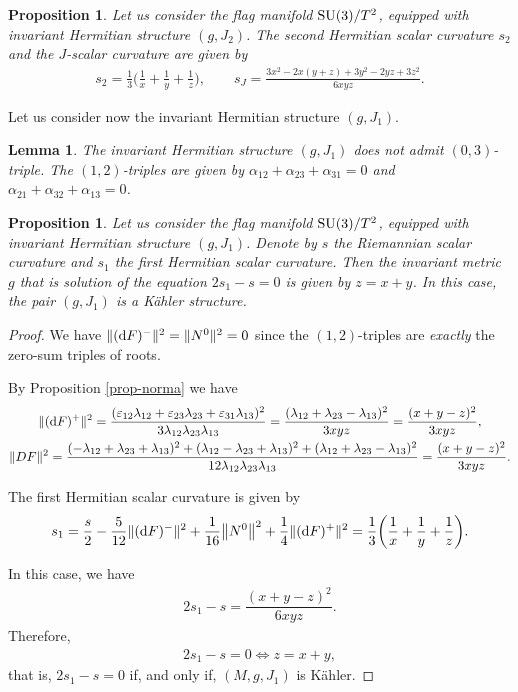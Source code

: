 \documentclass[10pt,a4paper]{amsart}
\numberwithin{equation}{section}
\newtheorem{Lemma}[Theorem]{Lemma}
\newtheorem{Proposition}[Theorem]{Proposition}
 { \theoremstyle{definition}
\newtheorem{Definition}[Theorem]{Definition}
\newtheorem{Question}[Theorem]{Question}
\newtheorem*{Notation}{Notation}
\newtheorem{Example}[Theorem]{Example}
\newtheorem{Remark}[Theorem]{Remark} }
\begin{document}
\begin{Proposition}
Let us consider the flag manifold ${\rm SU}(3)/T^2$, equipped with invariant Hermitian structure $(g, J_{2})$. The second Hermitian scalar curvature $s_2$ and the $J$-scalar curvature are given by
\begin{gather*}
s_{2}=\frac{1}{3} \bigg(\frac{1}{x}+\frac{1}{y}+\frac{1}{z}\bigg),
\qquad
s_{J}=\frac{3 x^2-2 x (y+z)+3 y^2-2 y z+3 z^2}{6 x y z}.
\end{gather*}
\end{Proposition}

Let us consider now the invariant Hermitian structure $(g, J_{1})$.

\begin{Lemma}
The invariant Hermitian structure $(g, J_{1})$ does not admit $(0,3)$-triple. The $(1,2)$-triples are given by $\alpha_{12}+\alpha_{23}+\alpha_{31}=0$ and $\alpha_{21}+\alpha_{32}+\alpha_{13}=0$.
\end{Lemma}

\begin{Proposition}\label{prop-su3-j1}
Let us consider the flag manifold ${\rm SU}(3)/T^2$, equipped with invariant Hermitian structure $(g, J_{1})$. Denote by $s$ the Riemannian scalar curvature and $s_1$ the first Hermitian scalar curvature. Then the invariant metric $g$ that is solution of the equation $2s_1-s=0$ is given by $z=x+y$. In this case, the pair $(g, J_{1})$ is a K\"ahler structure.
\end{Proposition}
\begin{proof}
We have $\|({\rm d}F)^{-}\|^{2}=\|N^0\|^{2}=0$ since the $(1,2)$-triples are {\it exactly} the zero-sum triples of roots.

By Proposition \ref{prop-norma} we have
\begin{gather*}
\|({\rm d}F)^{+}\|^{2}=\dfrac{(\varepsilon_{12}\lambda_{12}+\varepsilon_{23}\lambda_{23} +\varepsilon_{31}\lambda_{13})^{2}}{3\lambda_{12}\lambda_{23}\lambda_{13}} =\dfrac{(\lambda_{12}+\lambda_{23}-\lambda_{13})^{2}}{3xyz}
=\dfrac{(x+y-z)^{2}}{3xyz},
\\
\|DF\|^2=\dfrac{(-\lambda_{12}+\lambda_{23}+\lambda_{13})^2+(\lambda_{12}-\lambda_{23} +\lambda_{13})^2+(\lambda_{12}+\lambda_{23}-\lambda_{13})^2}{12 \lambda_{12}\lambda_{23}\lambda_{13}}
=\dfrac{(x+y-z)^{2}}{3xyz}.
\end{gather*}

The first Hermitian scalar curvature is given by
\begin{align*}
s_{1}=\dfrac{s}{2}-\dfrac{5}{12}\|({\rm d}F)^{-}\|^{2}+\dfrac{1}{16}\big\|N^{0}\big\|^{2}+\dfrac{1}{4}\|({\rm d}F)^{+}\|^{2}
=\dfrac{1}{3}\bigg(\dfrac{1}{x}+\dfrac{1}{y}+\dfrac{1}{z}\bigg).
\end{align*}

In this case, we have
\begin{gather*}
2s_{1}-s=\dfrac{(x+y-z)^{2}}{6xyz}.
\end{gather*}
Therefore,
\begin{gather*}
2s_{1}-s=0\Leftrightarrow z=x+y,
\end{gather*}
that is, $2s_{1}-s=0$ if, and only if, $(M,g,J_1)$ is K\"ahler.
\end{proof}
\end{document}
